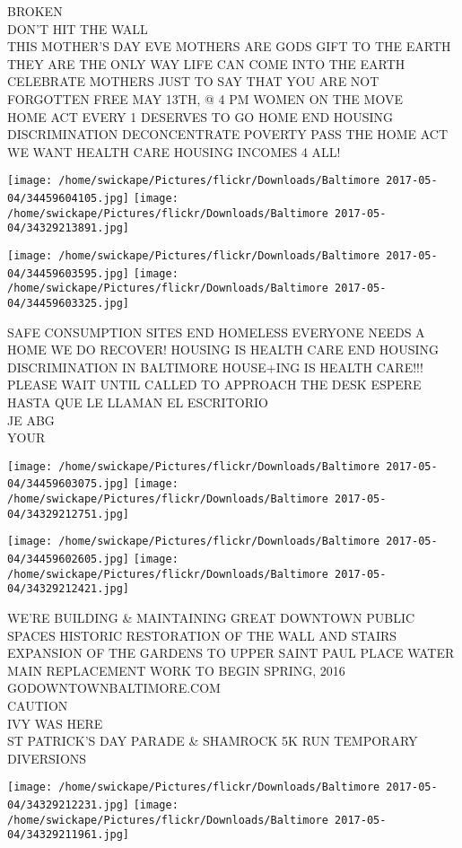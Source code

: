 \documentclass[10pt,letterpaper]{article}
\begin{document}
BROKEN\\
DON'T HIT THE WALL\\
THIS MOTHER'S DAY EVE MOTHERS ARE GODS GIFT TO THE EARTH THEY ARE THE ONLY WAY LIFE CAN COME INTO THE EARTH CELEBRATE MOTHERS JUST TO SAY THAT YOU ARE NOT FORGOTTEN FREE MAY 13TH, @ 4 PM WOMEN ON THE MOVE\\
HOME ACT EVERY 1 DESERVES TO GO HOME END HOUSING DISCRIMINATION DECONCENTRATE POVERTY PASS THE HOME ACT WE WANT HEALTH CARE HOUSING INCOMES 4 ALL!
\pagebreak

\texttt{[image: /home/swickape/Pictures/flickr/Downloads/Baltimore 2017-05-04/34459604105.jpg]}
\texttt{[image: /home/swickape/Pictures/flickr/Downloads/Baltimore 2017-05-04/34329213891.jpg]}

\texttt{[image: /home/swickape/Pictures/flickr/Downloads/Baltimore 2017-05-04/34459603595.jpg]}
\texttt{[image: /home/swickape/Pictures/flickr/Downloads/Baltimore 2017-05-04/34459603325.jpg]}

SAFE CONSUMPTION SITES END HOMELESS EVERYONE NEEDS A HOME WE DO RECOVER!  HOUSING IS HEALTH CARE END HOUSING DISCRIMINATION IN BALTIMORE HOUSE+ING IS HEALTH CARE!!!\\
PLEASE WAIT UNTIL CALLED TO APPROACH THE DESK ESPERE HASTA QUE LE LLAMAN EL ESCRITORIO\\
JE ABG\\
YOUR
\pagebreak

\texttt{[image: /home/swickape/Pictures/flickr/Downloads/Baltimore 2017-05-04/34459603075.jpg]}
\texttt{[image: /home/swickape/Pictures/flickr/Downloads/Baltimore 2017-05-04/34329212751.jpg]}

\texttt{[image: /home/swickape/Pictures/flickr/Downloads/Baltimore 2017-05-04/34459602605.jpg]}
\texttt{[image: /home/swickape/Pictures/flickr/Downloads/Baltimore 2017-05-04/34329212421.jpg]}

WE'RE BUILDING \& MAINTAINING GREAT DOWNTOWN PUBLIC SPACES HISTORIC RESTORATION OF THE WALL AND STAIRS EXPANSION OF THE GARDENS TO UPPER SAINT PAUL PLACE WATER MAIN REPLACEMENT WORK TO BEGIN SPRING, 2016 GODOWNTOWNBALTIMORE.COM\\
CAUTION\\
IVY WAS HERE\\
ST PATRICK'S DAY PARADE \& SHAMROCK 5K RUN TEMPORARY DIVERSIONS
\pagebreak

\texttt{[image: /home/swickape/Pictures/flickr/Downloads/Baltimore 2017-05-04/34329212231.jpg]}
\texttt{[image: /home/swickape/Pictures/flickr/Downloads/Baltimore 2017-05-04/34329211961.jpg]}
\end{document}
